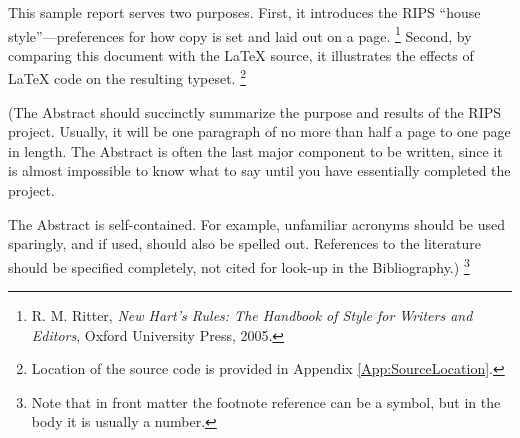 
This sample report serves two purposes.
First, it introduces the RIPS ``house style''---preferences for how copy is set and laid out on a page.%
\footnote{
R. M. Ritter, {\em New Hart's Rules:  The Handbook of Style for Writers and Editors}, Oxford University Press, 2005.
}
Second, by comparing this document with the {\LaTeX} source, it illustrates the effects of {\LaTeX} code on the resulting typeset.%
\footnote{
Location of the source code is provided in Appendix \ref{App:SourceLocation}.
}

\vspace{24pt}
(The Abstract should succinctly summarize the purpose and results of the RIPS project. 
Usually, it will be one paragraph of no more than half a page to one page in length.
The Abstract is often the last major component to be written, since it is almost impossible to know what to say until you have essentially completed the project.

The Abstract is self-contained.
For example, unfamiliar acronyms should be used sparingly, and if used, should also be spelled out.
References to the literature should be specified completely, not cited for look-up in the Bibliography.)%
\footnote{
Note that in front matter the footnote reference can be a symbol, but in the body it is usually a number.
}
